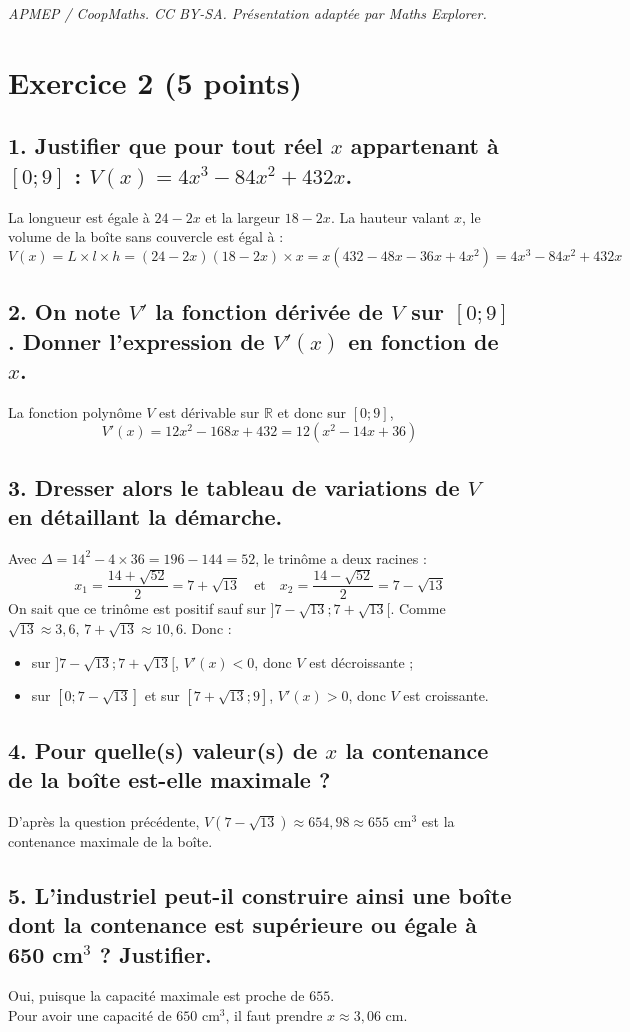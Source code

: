 \documentclass[10pt]{article}
\begin{document}
\noindent\textit{APMEP / CoopMaths. CC BY-SA. Présentation adaptée par Maths Explorer.}\par\medskip
\section*{Exercice 2 (5 points)}

\subsection*{1. Justifier que pour tout réel $x$ appartenant à $[0 ; 9]$ : $V(x) = 4x^3 - 84x^2 + 432x$.}
La longueur est égale à $24 - 2x$ et la largeur $18 - 2x$. La hauteur valant $x$, le volume de la boîte sans couvercle est égal à :
\[V(x) = L \times l \times h = (24 - 2x)(18 - 2x) \times x = x(432 - 48x - 36x + 4x^2) = 4x^3 - 84x^2 + 432x	\]
	
\subsection*{2. On note $V'$ la fonction dérivée de $V$ sur $[0 ; 9]$. Donner l’expression de $V'(x)$ en fonction de $x$.}
La fonction polynôme $V$ est dérivable sur $\mathbb{R}$ et donc sur $[0 ; 9]$,
	\[	V'(x) = 12x^2 - 168x + 432 = 12(x^2 - 14x + 36)	\]
	
\subsection*{3. Dresser alors le tableau de variations de $V$ en détaillant la démarche.}
Avec $\Delta = 14^2 - 4 \times 36 = 196 - 144 = 52$, le trinôme a deux racines :
	\[
	x_1 = \dfrac{14 + \sqrt{52}}{2} = 7 + \sqrt{13} \quad \text{et} \quad x_2 = \dfrac{14 - \sqrt{52}}{2} = 7 - \sqrt{13}
	\]
On sait que ce trinôme est positif sauf sur $]7 - \sqrt{13} ; 7 + \sqrt{13}[$. Comme $\sqrt{13} \approx 3,6$, $7 + \sqrt{13} \approx 10,6$. Donc :
	\begin{itemize}
		\item sur $]7 - \sqrt{13} ; 7 + \sqrt{13}[$, $V'(x) < 0$, donc $V$ est décroissante ;
		\item sur $[0 ; 7 - \sqrt{13}]$ et sur $[7 + \sqrt{13} ; 9]$, $V'(x) > 0$, donc $V$ est croissante.
	\end{itemize}
	
	\subsection*{4. Pour quelle(s) valeur(s) de $x$ la contenance de la boîte est-elle maximale ?}
	
	D’après la question précédente, $V(7 - \sqrt{13}) \approx 654,98 \approx 655 \text{ cm}^3$ est la contenance maximale de la boîte.
	
	\subsection*{5. L’industriel peut-il construire ainsi une boîte dont la contenance est supérieure ou égale à 650 cm$^3$ ? Justifier.}
	
	Oui, puisque la capacité maximale est proche de $655$.\\
	 Pour avoir une capacité de $650$ cm$^3$, il faut prendre $x \approx 3,06$ cm.
\end{document}
